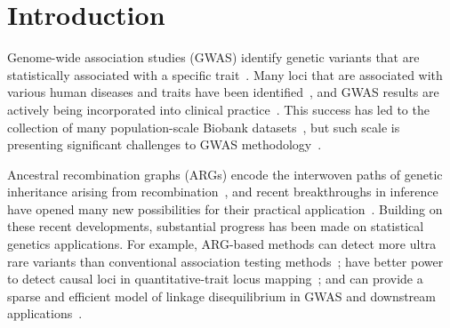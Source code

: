 \documentclass[unnumsec,webpdf,modern,large,namedate]{oup-authoring-template}%
\begin{document}

\maketitle

\section{Introduction}

Genome-wide association studies (GWAS)
identify genetic variants that are statistically
associated with a specific trait~\citep{uffelmann2021}.
Many loci that are associated with various human diseases and
traits have been
identified~\citep[e.g.][]{yengo2022,mathieson2023},
and GWAS results are actively being incorporated into clinical
practice~\citep{visscher2017}.
This success has led to the collection of many population-scale Biobank
datasets~\citep{tanjo2021practical},
but such scale is presenting significant challenges to GWAS
methodology~\citep{uffelmann2021}.

Ancestral recombination graphs (ARGs) encode the interwoven paths
of genetic inheritance arising from
recombination~\citep{hudson1983properties,griffiths1997ancestral,wong2023general},
and recent
breakthroughs in inference have opened many new possibilities for their
practical application~\citep{lewanski2023era}.
Building on these recent developments, substantial progress has been made
on statistical genetics applications.
For example,  ARG-based methods
can detect more ultra rare variants than conventional association testing
methods~\citep{zhang2023};
have better power to detect causal loci in
quantitative-trait locus mapping~\citep{link2023tree};
and can provide a sparse and efficient model of linkage disequilibrium
in GWAS and downstream applications~\citep{nowbandegani2023extremely}.
\end{document}

